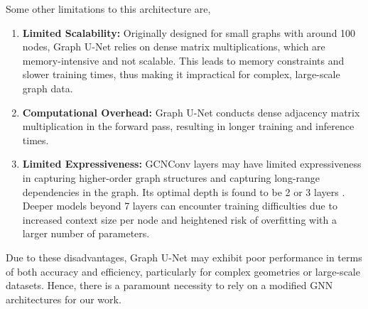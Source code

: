Some other limitations to this architecture are,  
\begin{enumerate}
    \item \textbf{Limited Scalability:} Originally designed for small graphs with around 100 nodes, Graph U-Net relies on dense matrix multiplications, which are memory-intensive and not scalable. This leads to memory constraints and slower training times, thus making it impractical for complex, large-scale graph data.
    \item \textbf{Computational Overhead:} Graph U-Net conducts dense adjacency matrix multiplication in the forward pass, resulting in longer training and inference times.
    \item \textbf{Limited Expressiveness:} GCNConv layers may have limited expressiveness in capturing higher-order graph structures and capturing long-range dependencies in the graph. Its optimal depth is found to be 2 or 3 layers \cite{kipf}. Deeper models beyond 7 layers can encounter training difficulties due to increased context size per node and heightened risk of overfitting with a larger number of parameters.
\end{enumerate}
Due to these disadvantages, Graph U-Net may exhibit poor performance in terms of both accuracy and efficiency, particularly for complex geometries or large-scale datasets. Hence, there is a paramount necessity to rely on a modified GNN architectures for our work.
